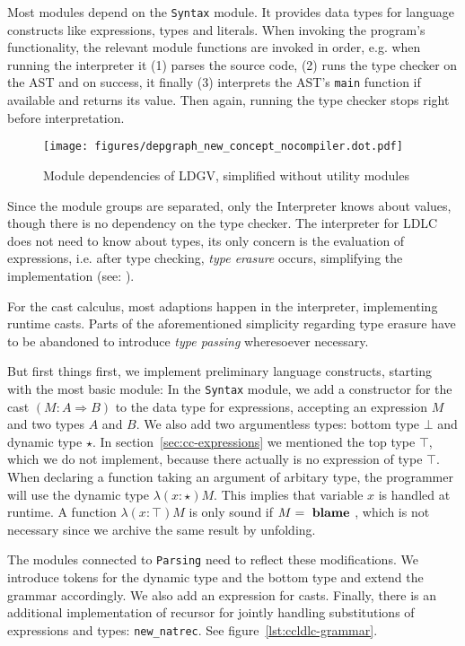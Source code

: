 Most modules depend on the \texttt{Syntax} module. It provides data types for language constructs like expressions, types and literals. When invoking the program's functionality, the relevant module functions are invoked in order, e.g. when running the interpreter it (1) parses the source code, (2) runs the type checker on the AST and on success, it finally (3) interprets the AST's \texttt{main} function if available and returns its value.   Then again, running the type checker stops right before interpretation.

\begin{figure}
 \centering
 \texttt{[image: figures/depgraph\_new\_concept\_nocompiler.dot.pdf]}
 \caption[Module dependencies of LDGV]{Module dependencies of LDGV, simplified without utility modules}
 \label{fig:dependency-graph}
\end{figure}

Since the module groups are separated, only the Interpreter knows about values, though there is no dependency on the type checker. The interpreter for LDLC does not need to know about types, its only concern is the evaluation of expressions, i.e. after type checking, \emph{type erasure} occurs, simplifying the implementation (see: \cite{crary2002}).

For the cast calculus, most adaptions happen in the interpreter, implementing runtime casts. Parts of the aforementioned simplicity regarding type erasure have to be abandoned to introduce \emph{type passing} wheresoever necessary.

But first things first, we implement preliminary language constructs, starting with the most basic module: In the \texttt{Syntax} module, we add a constructor for the cast $(M : A \Rightarrow B)$ to the data type for expressions, accepting an expression $M$ and two types $A$ and $B$. We also add two argumentless types: bottom type $\bot$ and dynamic type $\star$. In section~\ref{sec:cc-expressions} we mentioned the top type $\top$, which we do not implement, because there actually is no expression of type $\top$. When declaring a function taking an argument of arbitary type, the programmer will use the dynamic type $\lambda(x:\star)M$. This implies that variable $x$ is handled at runtime. A function $\lambda(x:\top)M$ is only sound if $M = \text{ \textbf{blame} }$, which is not necessary since we archive the same result by unfolding.

The modules connected to \texttt{Parsing} need to reflect these modifications. We introduce tokens for the dynamic type and the bottom type and extend the grammar accordingly. We also add an expression for casts. Finally, there is an additional implementation of recursor \rec for jointly handling substitutions of expressions and types: \texttt{new\_natrec}. See figure~\ref{lst:ccldlc-grammar}.

